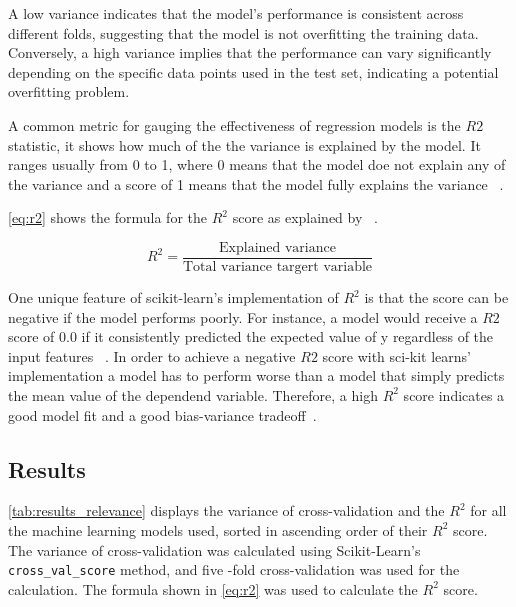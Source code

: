 A low variance indicates that the model's performance is consistent across
different folds, suggesting that the model is not overfitting the training data.
Conversely, a high variance implies that the performance can vary significantly
depending on the specific data points used in the test set, indicating a potential
overfitting problem.

A common metric for gauging the effectiveness of regression models is the $R2$ statistic, it shows how much of the
the variance is explained by the model.
It ranges usually from 0 to 1, where 0 means that the model doe not explain any of the variance and a score of 1
means that the model fully explains the variance
~\cite[p. 43]{muller_introductionmachinelearning_2016}.

\cref{eq:r2} shows the formula for the $R^2$ score as explained by
~\cite[p. 43]{muller_introductionmachinelearning_2016}.

\begin{equation}
    \label{eq:r2}
    R^2 = \frac{\text{Explained variance}}{\text{Total variance targert variable}}
\end{equation}

One unique feature of scikit-learn's implementation of $R^2$ is that the score can be negative if the model performs
poorly.
For instance, a model would receive a $R2$ score of 0.0 if it consistently predicted the expected value of y
regardless of the input features
~\cite{_sklearnmetricsr2_}.
In order to achieve a negative $R2$ score with sci-kit learns' implementation a model has to perform worse than a
model that simply predicts the mean value of the dependend variable.
Therefore, a high $R^2$ score indicates a good model fit and a good bias-variance
tradeoff~\cite[p. 43]{muller_introductionmachinelearning_2016}.

\subsection{Results}\label{subsec:results3}

\cref*{tab:results_relevance} displays the variance of cross-validation and the $R^2$ for all the machine
learning models used, sorted in ascending order of their $R^2$ score.
The variance of cross-validation was calculated using Scikit-Learn's \texttt{cross\_val\_score} method, and five
-fold cross-validation was used for the calculation.
The formula shown in \cref{eq:r2} was used to calculate the $R^2$ score.

